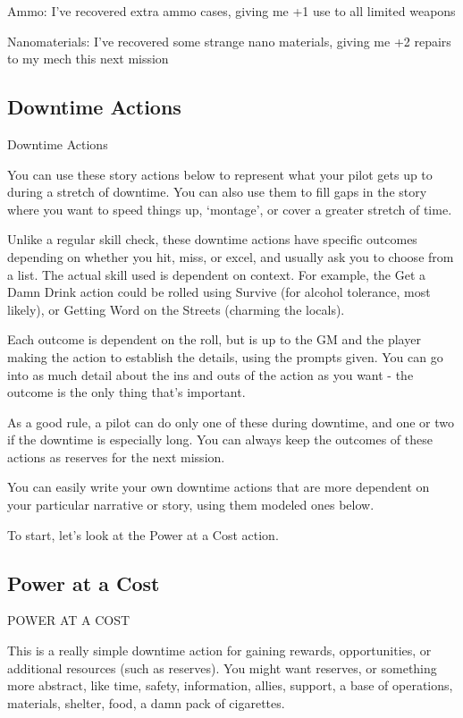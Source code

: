 	        Ammo: I’ve recovered extra ammo cases, giving me +1 use to all limited weapons

	        Nanomaterials: I’ve recovered some strange nano materials, giving me +2 repairs to my
mech this next mission



\subsection{Downtime Actions}

                                           Downtime Actions


You can use these story actions below to represent what your pilot gets up to during a stretch of
downtime. You can also use them to fill gaps in the story where you want to speed things up,
‘montage’, or cover a greater stretch of time.


Unlike a regular skill check, these downtime actions have specific outcomes depending on
whether you hit, miss, or excel, and usually ask you to choose from a list. The actual skill used is
dependent on context. For example, the Get a Damn Drink action could be rolled using Survive
(for alcohol tolerance, most likely), or Getting Word on the Streets (charming the locals).


Each outcome is dependent on the roll, but is up to the GM and the player making the action to
establish the details, using the prompts given. You can go into as much detail about the ins and
outs of the action as you want - the outcome is the only thing that’s important.

As a good rule, a pilot can do only one of these during downtime, and one or two if the downtime
is especially long. You can always keep the outcomes of these actions as reserves for the next
mission.

You can easily write your own downtime actions that are more dependent on your particular
narrative or story, using them modeled ones below.

To start, let’s look at the Power at a Cost action.

\subsection{Power at a Cost}
POWER AT A COST

This is a really simple downtime action for gaining rewards, opportunities, or additional
resources (such as reserves). You might want reserves, or something more abstract, like time,
safety, information, allies, support, a base of operations, materials, shelter, food, a damn
pack of cigarettes.



